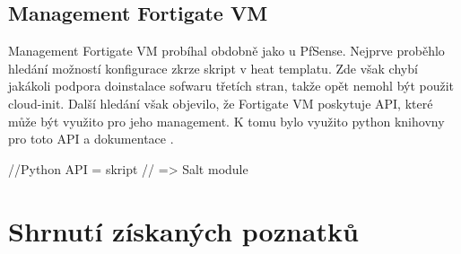 \subsection{Management Fortigate VM}

Management Fortigate VM probíhal obdobně jako u PfSense. Nejprve proběhlo hledání možností konfigurace zkrze skript v heat templatu. Zde však chybí jakákoli podpora doinstalace sofwaru třetích stran, takže opět nemohl být použit cloud-init. Další hledání však objevilo, že Fortigate VM poskytuje API, které může být využito pro jeho management. K tomu bylo využito python knihovny pro toto API a dokumentace \cite{pyfg}.

//Python API = skript
// => Salt module 


\section{Shrnutí získaných poznatků}